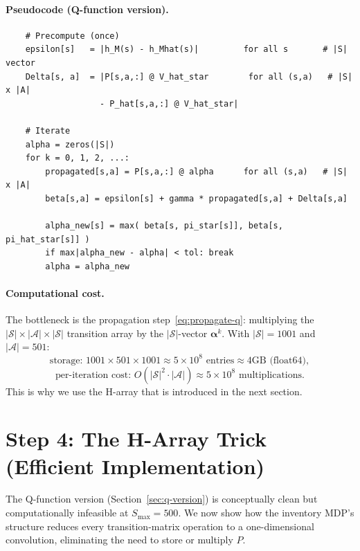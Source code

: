 \documentclass[11pt]{article}
\newcommand{\Smax}{S_{\max}}
\begin{document}
\paragraph{Pseudocode (Q-function version).}
\begin{verbatim}
    # Precompute (once)
    epsilon[s]   = |h_M(s) - h_Mhat(s)|         for all s       # |S| vector
    Delta[s, a]  = |P[s,a,:] @ V_hat_star        for all (s,a)   # |S| x |A|
                   - P_hat[s,a,:] @ V_hat_star|

    # Iterate
    alpha = zeros(|S|)
    for k = 0, 1, 2, ...:
        propagated[s,a] = P[s,a,:] @ alpha      for all (s,a)   # |S| x |A|
        beta[s,a] = epsilon[s] + gamma * propagated[s,a] + Delta[s,a]

        alpha_new[s] = max( beta[s, pi_star[s]], beta[s, pi_hat_star[s]] )
        if max|alpha_new - alpha| < tol: break
        alpha = alpha_new
\end{verbatim}

\paragraph{Computational cost.}
The bottleneck is the propagation step~\eqref{eq:propagate-q}: multiplying
the $|\mathcal{S}| \times |\mathcal{A}| \times |\mathcal{S}|$ transition
array by the $|\mathcal{S}|$-vector $\boldsymbol{\alpha}^k$.  With
$|\mathcal{S}| = 1001$ and $|\mathcal{A}| = 501$:
\[
  \text{storage: } 1001 \times 501 \times 1001 \approx 5 \times 10^8
  \text{ entries} \approx 4 \text{GB (float64)},
\]
\[
  \text{per-iteration cost: } O(|\mathcal{S}|^2 \cdot |\mathcal{A}|)
  \approx 5 \times 10^8 \text{ multiplications}.
\]
This is why we use the H-array that is introduced in the next section.

\section{Step 4: The H-Array Trick (Efficient Implementation)}
\label{sec:h-array}

The Q-function version (Section~\ref{sec:q-version}) is conceptually clean
but computationally infeasible at $\Smax = 500$.  We now show how the
inventory MDP's structure reduces every transition-matrix operation to a
one-dimensional convolution, eliminating the need to store or multiply $P$.
\end{document}
